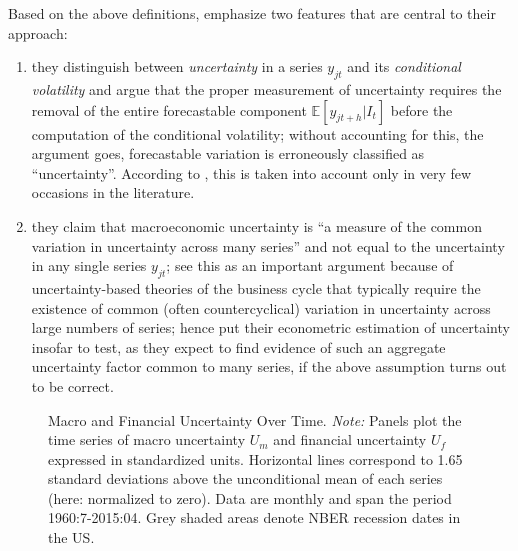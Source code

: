 \documentclass[a4paper,11pt,listof=nochaptergap,oneside,pointednumbers,bibtotoc,bigheadings,liststotoc]{scrbook}
\theoremstyle{mysatz}
\theoremstyle{mydefinition}
\theoremstyle{mytheorem}
\theoremstyle{mybemerkung}
\begin{document}
Based on the above definitions, \citet{juradoetal:15} emphasize two features that are central to their approach:
\begin{enumerate}
	\item they distinguish between \textit{uncertainty} in a series $y_{jt}$ and its \textit{conditional volatility} and argue that the proper measurement of uncertainty requires the removal of the entire forecastable component $\mathbb{E}[y_{jt+h}|I_t]$ before the computation of the conditional volatility; without accounting for this, the argument goes, forecastable variation is erroneously classified as ``uncertainty''. According to \citet{juradoetal:15}, this is taken into account only in very few occasions in the literature.
	\item they claim that macroeconomic uncertainty is ``a measure of the common variation in uncertainty across many series'' and not equal to the uncertainty in any single series $y_{jt}$; \citet{juradoetal:15} see this as an important argument because of uncertainty-based theories of the business cycle that typically require the existence of common (often countercyclical) variation in uncertainty across large numbers of series; \citet{juradoetal:15} hence put their econometric estimation of uncertainty insofar to test, as they expect to find evidence of such an aggregate uncertainty factor common to many series, if the above assumption turns out to be correct.
\end{enumerate}

\begin{figure}[!ht]
   \centering
   \setlength\fboxsep{0pt}
   \setlength\fboxrule{0pt}
      \caption[Macro and Financial Uncertainty Over Time.]{Macro and Financial Uncertainty Over Time.
      \textit{Note:} Panels plot the time series of macro uncertainty $U_m$ and financial uncertainty $U_f$ expressed in standardized units. Horizontal lines correspond to 1.65 standard deviations above the unconditional mean of each series (here: normalized to zero). Data are monthly and span the period 1960:7-2015:04. Grey shaded areas denote NBER recession dates in the US.}   \label{fig:macroAndfinUncertainty_index}
\end{figure}
\end{document}
